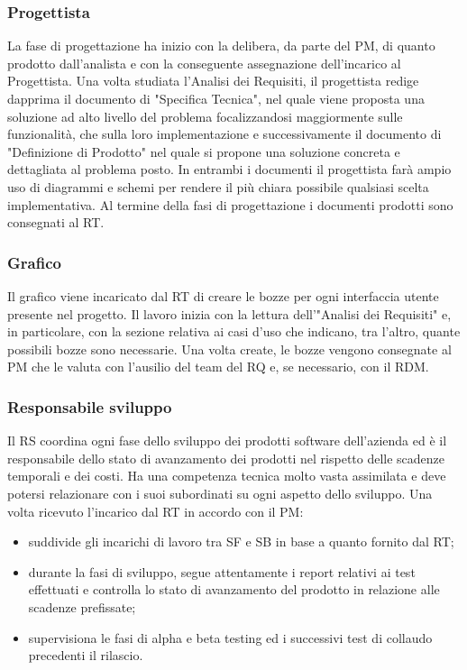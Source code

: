 \subsubsection{Progettista}
La fase di progettazione ha inizio con la delibera, da parte del PM, di quanto prodotto
dall\textquoteright{}analista e con la conseguente assegnazione dell\textquoteright{}incarico al Progettista. Una volta
studiata l\textquoteright{}Analisi dei Requisiti, il progettista redige dapprima il documento di "Specifica
Tecnica", nel quale viene proposta una soluzione ad alto livello del problema focalizzandosi
maggiormente sulle funzionalit\`{a}, che sulla loro implementazione e successivamente
il documento di "Definizione di Prodotto" nel quale si propone una soluzione concreta e
dettagliata al problema posto. In entrambi i documenti il progettista far\`{a} ampio uso di
diagrammi e schemi per rendere il pi\`{u} chiara possibile qualsiasi scelta implementativa.
Al termine della fasi di progettazione i documenti prodotti sono consegnati al RT.

\subsubsection{Grafico}
Il grafico viene incaricato dal RT di creare le bozze per ogni interfaccia utente presente
nel progetto. Il lavoro inizia con la lettura dell\textquoteright{}"Analisi dei Requisiti" e, in particolare,
con la sezione relativa ai casi d\textquoteright{}uso che indicano, tra l\textquoteright{}altro, quante possibili bozze sono
necessarie. Una volta create, le bozze vengono consegnate al PM che le valuta con
l\textquoteright{}ausilio del team del RQ e, se necessario, con il RDM.

\subsubsection{Responsabile sviluppo}
Il RS coordina ogni fase dello sviluppo dei prodotti software dell\textquoteright{}azienda ed \`{e} il responsabile
dello stato di avanzamento dei prodotti nel rispetto delle scadenze temporali e
dei costi. Ha una competenza tecnica molto vasta assimilata e deve potersi
relazionare con i suoi subordinati su ogni aspetto dello sviluppo. Una volta ricevuto
l\textquoteright{}incarico dal RT in accordo con il PM:
\begin{itemize}
\item suddivide gli incarichi di lavoro tra SF e SB in base a quanto fornito dal RT;
\item durante la fasi di sviluppo, segue attentamente i report relativi ai test effettuati e
controlla lo stato di avanzamento del prodotto in relazione alle scadenze prefissate;
\item supervisiona le fasi di alpha e beta testing ed i successivi test di collaudo precedenti
il rilascio.
\end{itemize}

